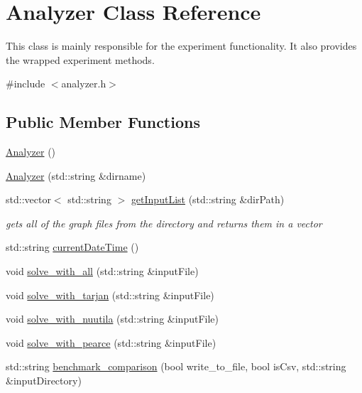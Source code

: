 \hypertarget{class_analyzer}{}\section{Analyzer Class Reference}
\label{class_analyzer}


This class is mainly responsible for the experiment functionality. It also provides the wrapped experiment methods.  




{\ttfamily \#include $<$analyzer.\+h$>$}

\subsection*{Public Member Functions}
\begin{DoxyCompactItemize}
\item 
\hyperlink{class_analyzer_a1be2ff17bba265bdef6e1b44748eaf96}{Analyzer} ()
\item 
\hyperlink{class_analyzer_a2aed8194a48a8385ef271af3bd6fdd42}{Analyzer} (std\+::string \&dirname)
\item 
std\+::vector$<$ std\+::string $>$ \hyperlink{class_analyzer_a7903ffdba689848dd199139e5dacf1bc}{get\+Input\+List} (std\+::string \&dir\+Path)
\begin{DoxyCompactList}\small\item\em gets all of the graph files from the directory and returns them in a vector \end{DoxyCompactList}\item 
std\+::string \hyperlink{class_analyzer_a9108681fee1078aed1af2ddee58cc55c}{current\+Date\+Time} ()
\item 
void \hyperlink{class_analyzer_a471ed64111b58f49cfee911b5db93ada}{solve\+\_\+with\+\_\+all} (std\+::string \&input\+File)
\item 
void \hyperlink{class_analyzer_a8207cd71986d26dc8abda1a807490ab2}{solve\+\_\+with\+\_\+tarjan} (std\+::string \&input\+File)
\item 
void \hyperlink{class_analyzer_a5ac77dbb2bbea6b34af561272705d64e}{solve\+\_\+with\+\_\+nuutila} (std\+::string \&input\+File)
\item 
void \hyperlink{class_analyzer_a6009c58addbb9730b54580a5f01ddce7}{solve\+\_\+with\+\_\+pearce} (std\+::string \&input\+File)
\item 
std\+::string \hyperlink{class_analyzer_ae4637e33a985efefebf2a10502be351c}{benchmark\+\_\+comparison} (bool write\+\_\+to\+\_\+file, bool is\+Csv, std\+::string \&input\+Directory)
\end{DoxyCompactItemize}
